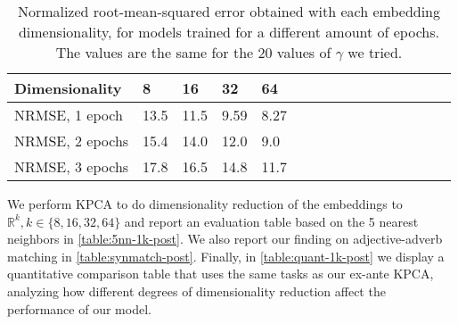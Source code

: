 \begin{table}[h!]

\centering

\begin{tabular}{|l|l|l|l|l|l|l|l|l|l|l|l|l|l|l|l|}
\hline
\rowcolor[HTML]{C0C0C0} 
Dimensionality & 8 & 16 & 32 & 64  \\ \hline
\cellcolor[HTML]{C0C0C0}NRMSE, 1 epoch & 13.5 & 11.5 & 9.59 & 8.27  \\ \hline
\cellcolor[HTML]{C0C0C0}NRMSE, 2 epochs & 15.4 & 14.0 & 12.0 & 9.0  \\ \hline
\cellcolor[HTML]{C0C0C0}NRMSE, 3 epochs & 17.8 & 16.5 & 14.8 & 11.7  \\ \hline

\end{tabular}
\caption{Normalized root-mean-squared error obtained with each embedding dimensionality, for models trained for a different amount of epochs. The values are the same for the 20 values of $\gamma$ we tried.}
\label{table:nmrse-post}
\end{table}

We perform KPCA to do dimensionality reduction of the embeddings to $\mathbb{R}^k, k \in \{8, 16, 32, 64\}$ and report an evaluation table based on the 5 nearest neighbors in \cref{table:5nn-1k-post}. We also report our finding on adjective-adverb matching in \cref{table:synmatch-post}. Finally, in \cref{table:quant-1k-post} we display a quantitative comparison table that uses the same tasks as our ex-ante KPCA, analyzing how different degrees of dimensionality reduction affect the performance of our model.


